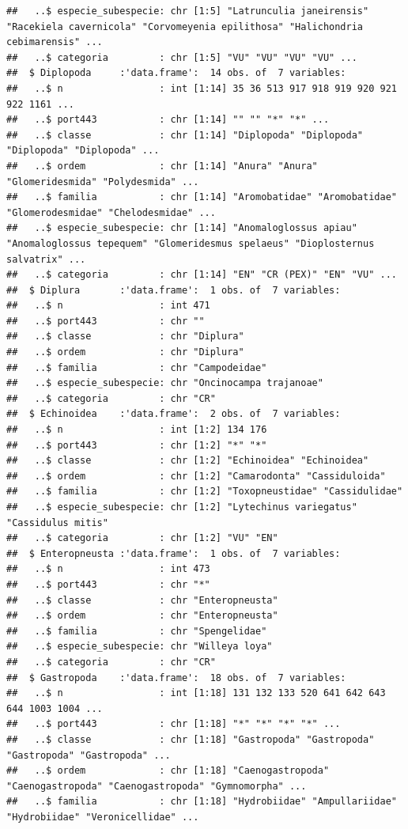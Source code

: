\documentclass[
]{article}
\begin{document}
\begin{verbatim}
##   ..$ especie_subespecie: chr [1:5] "Latrunculia janeirensis" "Racekiela cavernicola" "Corvomeyenia epilithosa" "Halichondria cebimarensis" ...
##   ..$ categoria         : chr [1:5] "VU" "VU" "VU" "VU" ...
##  $ Diplopoda     :'data.frame':  14 obs. of  7 variables:
##   ..$ n                 : int [1:14] 35 36 513 917 918 919 920 921 922 1161 ...
##   ..$ port443           : chr [1:14] "" "" "*" "*" ...
##   ..$ classe            : chr [1:14] "Diplopoda" "Diplopoda" "Diplopoda" "Diplopoda" ...
##   ..$ ordem             : chr [1:14] "Anura" "Anura" "Glomeridesmida" "Polydesmida" ...
##   ..$ familia           : chr [1:14] "Aromobatidae" "Aromobatidae" "Glomerodesmidae" "Chelodesmidae" ...
##   ..$ especie_subespecie: chr [1:14] "Anomaloglossus apiau" "Anomaloglossus tepequem" "Glomeridesmus spelaeus" "Dioplosternus salvatrix" ...
##   ..$ categoria         : chr [1:14] "EN" "CR (PEX)" "EN" "VU" ...
##  $ Diplura       :'data.frame':  1 obs. of  7 variables:
##   ..$ n                 : int 471
##   ..$ port443           : chr ""
##   ..$ classe            : chr "Diplura"
##   ..$ ordem             : chr "Diplura"
##   ..$ familia           : chr "Campodeidae"
##   ..$ especie_subespecie: chr "Oncinocampa trajanoae"
##   ..$ categoria         : chr "CR"
##  $ Echinoidea    :'data.frame':  2 obs. of  7 variables:
##   ..$ n                 : int [1:2] 134 176
##   ..$ port443           : chr [1:2] "*" "*"
##   ..$ classe            : chr [1:2] "Echinoidea" "Echinoidea"
##   ..$ ordem             : chr [1:2] "Camarodonta" "Cassiduloida"
##   ..$ familia           : chr [1:2] "Toxopneustidae" "Cassidulidae"
##   ..$ especie_subespecie: chr [1:2] "Lytechinus variegatus" "Cassidulus mitis"
##   ..$ categoria         : chr [1:2] "VU" "EN"
##  $ Enteropneusta :'data.frame':  1 obs. of  7 variables:
##   ..$ n                 : int 473
##   ..$ port443           : chr "*"
##   ..$ classe            : chr "Enteropneusta"
##   ..$ ordem             : chr "Enteropneusta"
##   ..$ familia           : chr "Spengelidae"
##   ..$ especie_subespecie: chr "Willeya loya"
##   ..$ categoria         : chr "CR"
##  $ Gastropoda    :'data.frame':  18 obs. of  7 variables:
##   ..$ n                 : int [1:18] 131 132 133 520 641 642 643 644 1003 1004 ...
##   ..$ port443           : chr [1:18] "*" "*" "*" "*" ...
##   ..$ classe            : chr [1:18] "Gastropoda" "Gastropoda" "Gastropoda" "Gastropoda" ...
##   ..$ ordem             : chr [1:18] "Caenogastropoda" "Caenogastropoda" "Caenogastropoda" "Gymnomorpha" ...
##   ..$ familia           : chr [1:18] "Hydrobiidae" "Ampullariidae" "Hydrobiidae" "Veronicellidae" ...

\end{verbatim}
\end{document}
